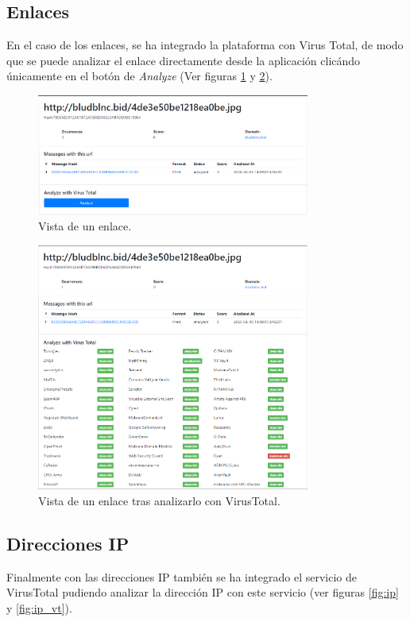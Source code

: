 \clearpage
\subsection{Enlaces} \label{vista_enlaces}
En el caso de los enlaces, se ha integrado la plataforma con Virus Total, de modo que se puede analizar el enlace directamente desde la aplicación clicándo únicamente en el botón de \textit{Analyze} (Ver figuras \ref{fig:enlace} y \ref{fig:enlace_vt}).

\begin{figure}[htb]
    \centering
    \includegraphics[width=0.8\textwidth]{imagenes/capturasAplicacion/Enlaces.png}
\caption{Vista de un enlace.}
\label{fig:enlace}
\end{figure}


\begin{figure}[htb]
    \centering
    \includegraphics[width=0.8\textwidth]{imagenes/capturasAplicacion/Enlaces_virusTotal.png}
\caption{Vista de un enlace tras analizarlo con VirusTotal.}
\label{fig:enlace_vt}
\end{figure}

\clearpage
\subsection{Direcciones IP} \label{vista_ip}
Finalmente con las direcciones IP también se ha integrado el servicio de VirusTotal pudiendo analizar la dirección IP con este servicio (ver figuras \ref{fig:ip} y \ref{fig:ip_vt}).

